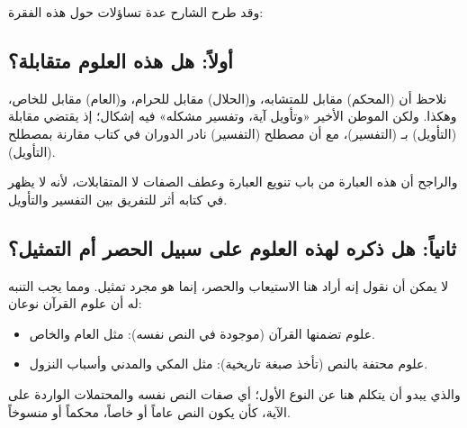 وقد طرح الشارح عدة تساؤلات حول هذه الفقرة:

\subsection{أولاً: هل هذه العلوم متقابلة؟}
نلاحظ أن (المحكم) مقابل للمتشابه، و(الحلال) مقابل للحرام، و(العام) مقابل للخاص، وهكذا. ولكن الموطن الأخير «وتأويل آية، وتفسير مشكله» فيه إشكال؛ إذ يقتضي مقابلة (التأويل) بـ (التفسير)، مع أن مصطلح (التفسير) نادر الدوران في كتاب  مقارنة بمصطلح (التأويل). 

والراجح أن هذه العبارة من باب تنويع العبارة وعطف الصفات لا المتقابلات، لأنه لا يظهر في كتابه أثر للتفريق بين التفسير والتأويل.

\subsection{ثانياً: هل ذكره لهذه العلوم على سبيل الحصر أم التمثيل؟}
لا يمكن أن نقول إنه أراد هنا الاستيعاب والحصر، إنما هو مجرد تمثيل. ومما يجب التنبه له أن علوم القرآن نوعان:
\begin{itemize}
    \item علوم تضمنها القرآن (موجودة في النص نفسه): مثل العام والخاص.
    \item علوم محتفة بالنص (تأخذ صبغة تاريخية): مثل المكي والمدني وأسباب النزول.
\end{itemize}
والذي يبدو أن  يتكلم هنا عن النوع الأول؛ أي صفات النص نفسه والمحتملات الواردة على الآية، كأن يكون النص عاماً أو خاصاً، محكماً أو منسوخاً.

